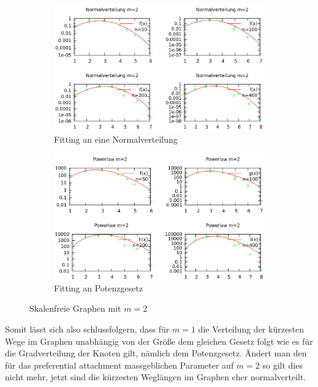\documentclass[10pt]{article}
\begin{document}
\begin{figure}[htb!]
\begin{subfigure}{.5\textwidth}
  \centering
  \includegraphics[width=1\linewidth]{../Results/Normal_M2_logscale.png}
  \caption{Fitting an eine Normalverteilung}
\end{subfigure}%
\begin{subfigure}{.5\textwidth}
  \centering
  \includegraphics[width=1\linewidth]{../Results/Power_M2_logscale.png}
  \caption{Fitting an Potenzgesetz}
\end{subfigure}
\caption{Skalenfreie Graphen mit $m=2$}
\label{fig:m2}
\end{figure}

Somit lässt sich also schlussfolgern, dass für $m=1$ die Verteilung der kürzesten Wege im Graphen unabhängig von der Größe dem gleichen Gesetz folgt wie es für die Gradverteilung der Knoten gilt, nämlich dem Potenzgesetz. Ändert man den für das preferential attachment massgeblichen Parameter auf $m=2$ so gilt dies nicht mehr, jetzt sind die kürzesten Weglängen im Graphen eher normalverteilt. 
\end{document}
